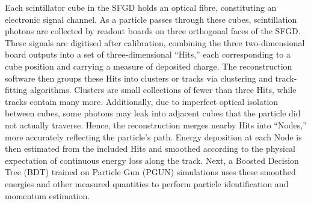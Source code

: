 Each scintillator cube in the SFGD holds an optical fibre, constituting an electronic signal channel.
As a particle passes through these cubes, scintillation photons are collected by readout boards on three orthogonal faces of the SFGD.
These signals are digitised after calibration, combining the three two-dimensional board outputs into a set of three-dimensional “Hits,” each corresponding to a cube position and carrying a measure of deposited charge.
The reconstruction software then groups these Hits into clusters or tracks via clustering and track-fitting algorithms.
Clusters are small collections of fewer than three Hits, while tracks contain many more.
Additionally, due to imperfect optical isolation between cubes, some photons may leak into adjacent cubes that the particle did not actually traverse.
Hence, the reconstruction merges nearby Hits into “Nodes,” more accurately reflecting the particle’s path.
Energy deposition at each Node is then estimated from the included Hits and smoothed according to the physical expectation of continuous energy loss along the track.
Next, a Boosted Decision Tree (BDT) trained on Particle Gun (PGUN) simulations uses these smoothed energies and other measured quantities to perform particle identification and momentum estimation.
